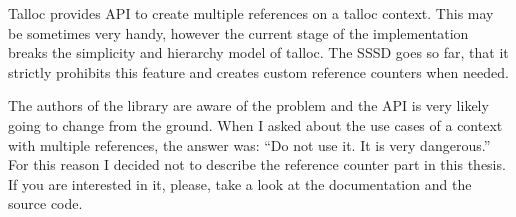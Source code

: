 Talloc provides API to create multiple references on a talloc context. This may
be sometimes very handy, however the current stage of the implementation breaks
the simplicity and hierarchy model of talloc. The SSSD goes so far, that it
strictly prohibits this feature and creates custom reference counters when
needed.

The authors of the library are aware of the problem and the API is very likely
going to change from the ground\cite{MailListReferences}. When I asked about
the use cases of a context with multiple references, the answer was: ``Do not
use it. It is very dangerous.'' For this reason I decided not to describe the
reference counter part in this thesis. If you are interested in it, please,
take a look at the documentation\cite{TallocDocReferences} and the source
code.
